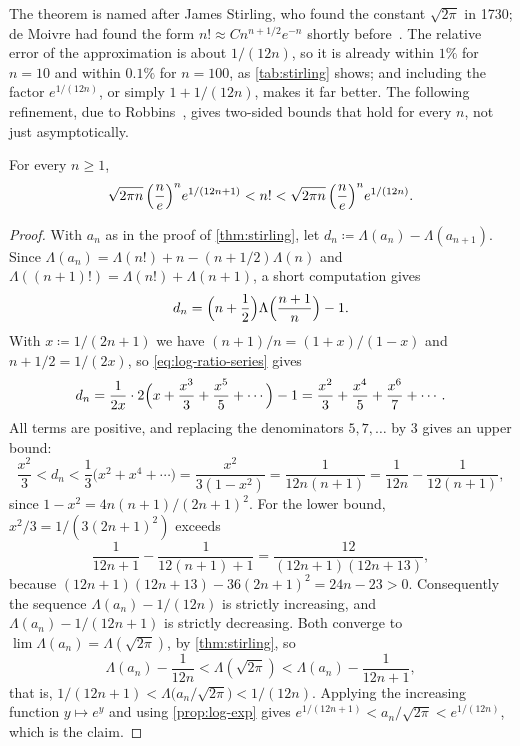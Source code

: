 The theorem is named after James Stirling, who found the constant $\sqrt{2\pi}$ in 1730; de Moivre had found the form $n!\approx Cn^{n+1/2}e^{-n}$ shortly before~\cite{tweddle2003,feller1968}. The relative error of the approximation is about $1/(12n)$, so it is already within $1\%$ for $n=10$ and within $0.1\%$ for $n=100$, as \cref{tab:stirling} shows; and including the factor $e^{1/(12n)}$, or simply $1+1/(12n)$, makes it far better. The following refinement, due to Robbins~\cite{robbins1955}, gives two-sided bounds that hold for every $n$, not just asymptotically.

\begin{theorem}
\label{thm:stirling-bounds}
For every $n\ge1$,
\[
\sqrt{2\pi n}\,\Bigl(\frac ne\Bigr)^ne^{1/(12n+1)}<n!<\sqrt{2\pi n}\,\Bigl(\frac ne\Bigr)^ne^{1/(12n)} .
\]
\end{theorem}

\begin{proof}
With $a_n$ as in the proof of \cref{thm:stirling}, let $d_n\coloneqq\Lambda(a_n)-\Lambda(a_{n+1})$. Since $\Lambda(a_n)=\Lambda(n!)+n-(n+1/2)\Lambda(n)$ and $\Lambda((n+1)!)=\Lambda(n!)+\Lambda(n+1)$, a short computation gives
\[
d_n=\Bigl(n+\frac12\Bigr)\Lambda\Bigl(\frac{n+1}n\Bigr)-1 .
\]
With $x\coloneqq1/(2n+1)$ we have $(n+1)/n=(1+x)/(1-x)$ and $n+1/2=1/(2x)$, so \eqref{eq:log-ratio-series} gives
\[
d_n=\frac1{2x}\cdot2\Bigl(x+\frac{x^3}3+\frac{x^5}5+\cdots\Bigr)-1=\frac{x^2}3+\frac{x^4}5+\frac{x^6}7+\cdots .
\]
All terms are positive, and replacing the denominators $5,7,\ldots$ by $3$ gives an upper bound:
\[
\frac{x^2}3<d_n<\frac13\bigl(x^2+x^4+\cdots\bigr)=\frac{x^2}{3(1-x^2)}=\frac1{12n(n+1)}=\frac1{12n}-\frac1{12(n+1)} ,
\]
since $1-x^2=4n(n+1)/(2n+1)^2$. For the lower bound, $x^2/3=1/(3(2n+1)^2)$ exceeds
\[
\frac1{12n+1}-\frac1{12(n+1)+1}=\frac{12}{(12n+1)(12n+13)},
\]
because $(12n+1)(12n+13)-36(2n+1)^2=24n-23>0$. Consequently the sequence $\Lambda(a_n)-1/(12n)$ is strictly increasing, and $\Lambda(a_n)-1/(12n+1)$ is strictly decreasing. Both converge to $\lim\Lambda(a_n)=\Lambda(\sqrt{2\pi})$, by \cref{thm:stirling}, so
\[
\Lambda(a_n)-\frac1{12n}<\Lambda(\sqrt{2\pi})<\Lambda(a_n)-\frac1{12n+1},
\]
that is, $1/(12n+1)<\Lambda\bigl(a_n/\sqrt{2\pi}\bigr)<1/(12n)$.
Applying the increasing function $y\mapsto e^y$ and using \cref{prop:log-exp} gives $e^{1/(12n+1)}<a_n/\sqrt{2\pi}<e^{1/(12n)}$, which is the claim.
\end{proof}

